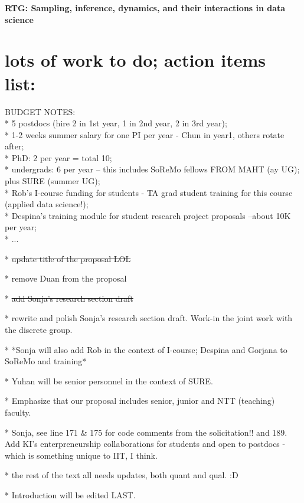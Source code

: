 \documentclass[11pt]{NSFamsart}
\begin{document}
  

\centerline{\large \textbf{RTG: Sampling, inference,  dynamics, and their interactions in data science}}

\section*{\color{magenta}lots of work to do; action items list:}

{\color{magenta}BUDGET NOTES: \\
* 5 postdocs (hire 2 in 1st year, 1 in 2nd year, 2 in 3rd year); \\
* 1-2 weeks summer salary for one PI per year - Chun in year1, others rotate after;\\
* PhD: 2 per year = total 10;\\
* undergrads: 6 per year -- this includes SoReMo fellows FROM MAHT (ay UG); plus SURE (summer UG); \\
* Rob's I-course funding for students - TA grad student training for this course (applied data science!);\\
* Despina's training module for student research project proposals --about 10K per year; \\
* ... 
}

* \sout{update title of the proposal LOL} 

* remove Duan from the proposal

* \sout{add Sonja's research section draft}

* rewrite and polish Sonja's research section draft.  Work-in the joint work with the discrete group.

* *Sonja will also add Rob in the context of I-course; Despina and Gorjana to SoReMo and training*

* Yuhan will be senior personnel in the context of SURE. 

* Emphasize that our proposal includes senior, junior and NTT (teaching) faculty. 

* Sonja, see line 171 \& 175 for code comments from the solicitation!!  and 189. Add KI's enterpreneurship collaborations for students and open to postdocs - which is something unique to IIT, I think. 

* the rest of the text all needs updates, both quant and qual. :D 

* Introduction will be edited LAST. 
\end{document}
